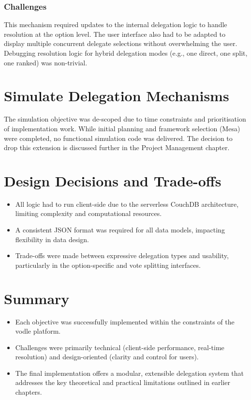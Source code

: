 \subsubsection{Challenges}
This mechanism required updates to the internal delegation logic to handle resolution at the option level. The user interface also had to be adapted to display multiple concurrent delegate selections without overwhelming the user. Debugging resolution logic for hybrid delegation modes (e.g., one direct, one split, one ranked) was non-trivial.

\section{Simulate Delegation Mechanisms}
The simulation objective was de-scoped due to time constraints and prioritisation of implementation work. While initial planning and framework selection (Mesa) were completed, no functional simulation code was delivered. The decision to drop this extension is discussed further in the Project Management chapter.

\section{Design Decisions and Trade-offs}
\begin{itemize}
  \item All logic had to run client-side due to the serverless CouchDB architecture, limiting complexity and computational resources.
  \item A consistent JSON format was required for all data models, impacting flexibility in data design.
  \item Trade-offs were made between expressive delegation types and usability, particularly in the option-specific and vote splitting interfaces.
\end{itemize}

\section{Summary}
\begin{itemize}
  \item Each objective was successfully implemented within the constraints of the vodle platform.
  \item Challenges were primarily technical (client-side performance, real-time resolution) and design-oriented (clarity and control for users).
  \item The final implementation offers a modular, extensible delegation system that addresses the key theoretical and practical limitations outlined in earlier chapters.
\end{itemize}


